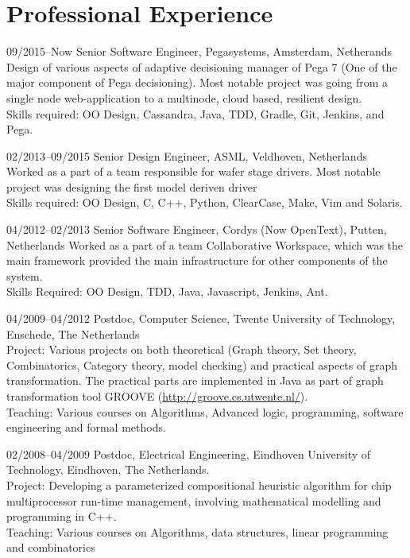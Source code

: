 \section{Professional Experience}

\begin{CV}
\item[09/2015--Now] Senior Software Engineer, Pegasystems, Amsterdam, Netherands
Design of various aspects of adaptive decisioning manager of Pega 7 (One of the major component of Pega decisioning). Most notable project was going from a single node web-application to a multinode, cloud based, resilient design. \\
Skills required: OO Design, Cassandra, Java, TDD, Gradle, Git, Jenkins, and Pega.

\item[02/2013--09/2015] Senior Design Engineer, ASML, Veldhoven, Netherlands
Worked as a part of a team responsible for wafer stage drivers. Most notable project was designing the first model deriven driver \\
Skills required: OO Design, C, C++, Python, ClearCase, Make, Vim and Solaris.

\item[04/2012--02/2013] Senior Software Engineer, Cordys (Now OpenText), Putten, Netherlands
Worked as a part of a team Collaborative Workspace, which was the main framework provided the main infrastructure for other components of the system. \\
Skills Required: OO Design, TDD, Java, Javascript, Jenkins, Ant.

\item[04/2009--04/2012]Postdoc, Computer Science, Twente University of
Technology, Enschede, The Netherlands \\
\ifindustry
Project: Various projects on both theoretical (Graph theory, Set theory, Combinatorics, Category theory, model checking) and practical aspects of graph transformation. The practical
parts are implemented in Java as part of graph transformation tool GROOVE (\url{http://groove.cs.utwente.nl/}).  \\
Teaching: Various courses on Algorithms, Advanced logic, programming, software engineering and formal methods.
\fi

\item[02/2008--04/2009] Postdoc, Electrical Engineering, Eindhoven University
of Technology, Eindhoven, The Netherlands. \\
\ifindustry
Project: Developing a parameterized compositional heuristic algorithm for chip multiprocessor run-time management, involving mathematical modelling and programming in C++.\\
Teaching: Various courses on Algorithms, data structures, linear programming and combinatorics
\fi


\end{CV}
